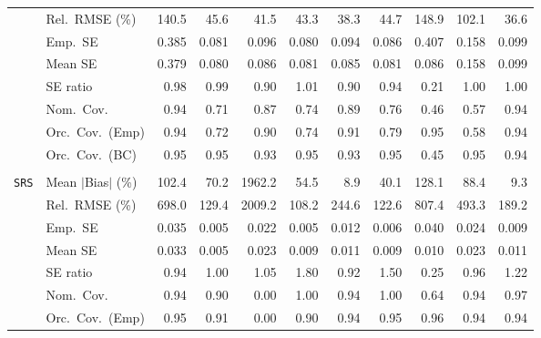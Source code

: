\begin{landscape}
\begin{longtable}{llrrrrrrrrr}
 & Rel.\ RMSE (\%) & 140.5 & 45.6 & \cellcolor{rankthree}41.5 & 43.3 & \cellcolor{ranktwo}38.3 & 44.7 & 148.9 & 102.1 & \cellcolor{rankone}36.6 \\
 & Emp.\ SE & 0.385 & 0.081 & 0.096 & 0.080 & 0.094 & 0.086 & 0.407 & 0.158 & 0.099 \\
 & Mean SE & 0.379 & 0.080 & 0.086 & 0.081 & 0.085 & 0.081 & 0.086 & 0.158 & 0.099 \\
 & SE ratio & \cellcolor{rankthree}0.98 & \cellcolor{ranktwo}0.99 & 0.90 & \cellcolor{ranktwo}1.01 & 0.90 & 0.94 & 0.21 & \cellcolor{rankone}1.00 & \cellcolor{rankone}1.00 \\
 & Nom.\ Cov. & \cellcolor{rankone}0.94 & 0.71 & \cellcolor{rankthree}0.87 & 0.74 & \cellcolor{ranktwo}0.89 & 0.76 & 0.46 & 0.57 & \cellcolor{rankone}0.94 \\
 & Orc.\ Cov.\ (Emp) & \cellcolor{ranktwo}0.94 & 0.72 & 0.90 & 0.74 & \cellcolor{rankthree}0.91 & 0.79 & \cellcolor{rankone}0.95 & 0.58 & \cellcolor{ranktwo}0.94 \\
 & Orc.\ Cov.\ (BC) & \cellcolor{rankone}0.95 & \cellcolor{rankone}0.95 & \cellcolor{rankthree}0.93 & \cellcolor{rankone}0.95 & \cellcolor{rankthree}0.93 & \cellcolor{rankone}0.95 & 0.45 & \cellcolor{rankone}0.95 & \cellcolor{ranktwo}0.94 \\
\addlinespace[2pt]
\multicolumn{11}{l}{\textbf{Interaction}} \\
\addlinespace[2pt]
\quad \texttt{SRS} & Mean $|$Bias$|$ (\%) & 102.4 & 70.2 & 1962.2 & 54.5 & \cellcolor{rankone}8.9 & \cellcolor{rankthree}40.1 & 128.1 & 88.4 & \cellcolor{ranktwo}9.3 \\
 & Rel.\ RMSE (\%) & 698.0 & \cellcolor{rankthree}129.4 & 2009.2 & \cellcolor{rankone}108.2 & 244.6 & \cellcolor{ranktwo}122.6 & 807.4 & 493.3 & 189.2 \\
 & Emp.\ SE & 0.035 & 0.005 & 0.022 & 0.005 & 0.012 & 0.006 & 0.040 & 0.024 & 0.009 \\
 & Mean SE & 0.033 & 0.005 & 0.023 & 0.009 & 0.011 & 0.009 & 0.010 & 0.023 & 0.011 \\
 & SE ratio & 0.94 & \cellcolor{rankone}1.00 & \cellcolor{rankthree}1.05 & 1.80 & 0.92 & 1.50 & 0.25 & \cellcolor{ranktwo}0.96 & 1.22 \\
 & Nom.\ Cov. & \cellcolor{rankone}0.94 & \cellcolor{rankthree}0.90 & 0.00 & \cellcolor{rankthree}1.00 & \cellcolor{rankone}0.94 & \cellcolor{rankthree}1.00 & 0.64 & \cellcolor{rankone}0.94 & \cellcolor{ranktwo}0.97 \\
 & Orc.\ Cov.\ (Emp) & \cellcolor{rankone}0.95 & \cellcolor{rankthree}0.91 & 0.00 & 0.90 & \cellcolor{ranktwo}0.94 & \cellcolor{rankone}0.95 & \cellcolor{ranktwo}0.96 & \cellcolor{ranktwo}0.94 & \cellcolor{ranktwo}0.94 \\

\end{longtable}
\end{landscape}
